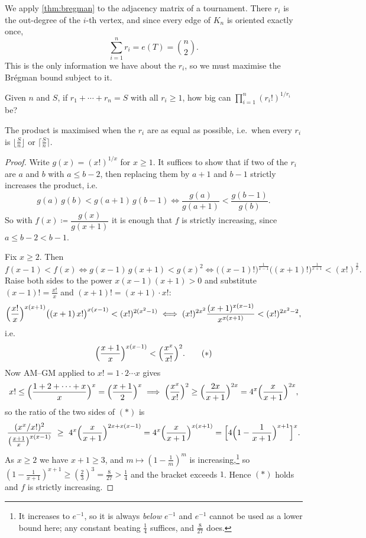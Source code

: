 We apply \autoref{thm:bregman} to the adjacency matrix of a tournament. There \(r_i\) is the out-degree of the \(i\)-th vertex, and since every edge of \(K_n\) is oriented exactly once,
\[
    \sum_{i=1}^{n} r_i = e(T) = \binom{n}{2}.
\]
This is the only information we have about the \(r_i\), so we must maximise the Br\'egman bound subject to it.

\begin{question}\label{q:balance}
    Given \(n\) and \(S\), if \(r_1 + \cdots + r_n = S\) with all \(r_i \ge 1\), how big can \(\prod_{i=1}^{n} (r_i!)^{1/r_i}\) be?
\end{question}

\begin{claim}\label{clm:balanced}
    The product is maximised when the \(r_i\) are as equal as possible, i.e.\ when every \(r_i\) is \(\lfloor \frac{S}{n} \rfloor\) or \(\lceil \frac{S}{n} \rceil\).
\end{claim}

\begin{proof}
    Write \(g(x) = (x!)^{1/x}\) for \(x \ge 1\). It suffices to show that if two of the \(r_i\) are \(a\) and \(b\) with \(a \le b - 2\), then replacing them by \(a+1\) and \(b-1\) strictly increases the product, i.e.
    \[
        g(a) \, g(b) < g(a+1) \, g(b-1)
        \iff \frac{g(a)}{g(a+1)} < \frac{g(b-1)}{g(b)}.
    \]
    So with \(f(x) \coloneqq \dfrac{g(x)}{g(x+1)}\) it is enough that \(f\) is strictly increasing, since \(a \le b-2 < b-1\).

    Fix \(x \ge 2\). Then
    \[
        f(x-1) < f(x)
        \iff g(x-1) \, g(x+1) < g(x)^2
        \iff \bigl( (x-1)! \bigr)^{\frac{1}{x-1}} \bigl( (x+1)! \bigr)^{\frac{1}{x+1}} < (x!)^{\frac{2}{x}}.
    \]
    Raise both sides to the power \(x(x-1)(x+1) > 0\) and substitute \((x-1)! = \frac{x!}{x}\) and \((x+1)! = (x+1) \cdot x!\):
    \[
        \Bigl( \frac{x!}{x} \Bigr)^{x(x+1)} \bigl( (x+1) \, x! \bigr)^{x(x-1)} < (x!)^{2(x^2-1)}
        \iff (x!)^{2x^2} \frac{(x+1)^{x(x-1)}}{x^{x(x+1)}} < (x!)^{2x^2 - 2},
    \]
    i.e.
    \[
        \Bigl( \frac{x+1}{x} \Bigr)^{x(x-1)} < \Bigl( \frac{x^x}{x!} \Bigr)^{2}. \tag{$\ast$}
    \]
    Now AM--GM applied to \(x! = 1 \cdot 2 \cdots x\) gives
    \[
        x! \le \Bigl( \frac{1 + 2 + \cdots + x}{x} \Bigr)^{x} = \Bigl( \frac{x+1}{2} \Bigr)^{x}
        \implies \Bigl( \frac{x^x}{x!} \Bigr)^{2} \ge \Bigl( \frac{2x}{x+1} \Bigr)^{2x} = 4^x \Bigl( \frac{x}{x+1} \Bigr)^{2x},
    \]
    so the ratio of the two sides of \((\ast)\) is
    \[
        \frac{(x^x/x!)^2}{\bigl( \frac{x+1}{x} \bigr)^{x(x-1)}}
        \ \ge\ 4^x \Bigl( \frac{x}{x+1} \Bigr)^{2x + x(x-1)}
        = 4^x \Bigl( \frac{x}{x+1} \Bigr)^{x(x+1)}
        = \Bigl[ 4 \Bigl( 1 - \frac{1}{x+1} \Bigr)^{x+1} \Bigr]^{x}.
    \]
    As \(x \ge 2\) we have \(x + 1 \ge 3\), and \(m \mapsto (1 - \frac{1}{m})^m\) is increasing,\footnote{It increases to \(e^{-1}\), so it is always \emph{below} \(e^{-1}\) and \(e^{-1}\) cannot be used as a lower bound here; any constant beating \(\frac{1}{4}\) suffices, and \(\frac{8}{27}\) does.} so \((1 - \frac{1}{x+1})^{x+1} \ge (\frac{2}{3})^3 = \frac{8}{27} > \frac{1}{4}\) and the bracket exceeds \(1\). Hence \((\ast)\) holds and \(f\) is strictly increasing.
\end{proof}

